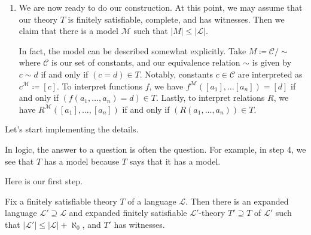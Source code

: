 \documentclass[../notes.tex]{subfiles}
\begin{document}
\begin{enumerate}
	\item We are now ready to do our construction. At this point, we may assume that our theory $T$ is finitely satisfiable, complete, and has witnesses. Then we claim that there is a model $\mathcal M$ such that $\left|M\right|\le\left|\mathcal L\right|$.
	
	In fact, the model can be described somewhat explicitly. Take $M\coloneqq\mathcal C/{\sim}$ where $\mathcal C$ is our set of constants, and our equivalence relation $\sim$ is given by $c\sim d$ if and only if $(c=d)\in T$. Notably, constants $c\in\mathcal C$ are interpreted as $c^\mathcal M\coloneqq[c]$. To interpret functions $f$, we have $f^\mathcal M([a_1],\ldots[a_n])=[d]$ if and only if $(f(a_1,\ldots,a_n)=d)\in T$. Lastly, to interpret relations $R$, we have $R^\mathcal M([a_1],\ldots,[a_n])$ if and only if $(R(a_1,\ldots,a_n))\in T$.
\end{enumerate}
Let's start implementing the details.
\begin{remark}
	In logic, the answer to a question is often the question. For example, in step 4, we see that $T$ has a model because $T$ says that it has a model.
\end{remark}
Here is our first step.
\begin{lemma}
	Fix a finitely satisfiable theory $T$ of a language $\mathcal L$. Then there is an expanded language $\mathcal L'\supseteq\mathcal L$ and expanded finitely satisfiable $\mathcal L'$-theory $T'\supseteq T$ of $\mathcal L'$ such that $\left|\mathcal L'\right|\le\left|\mathcal L\right|+\aleph_0$, and $T'$ has witnesses.
\end{lemma}
\end{document}
